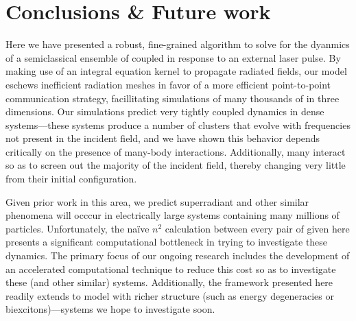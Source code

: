 \section{Conclusions \& Future work}
Here we have presented a robust, fine-grained algorithm to solve for the dyanmics of a semiclassical ensemble of coupled \qds{} in response to an external laser pulse. 
By making use of an integral equation kernel to propagate radiated fields, our model eschews inefficient radiation meshes in favor of a more efficient point-to-point communication strategy, facillitating simulations of many thousands of \qds{} in three dimensions.
Our simulations predict very tightly coupled dynamics in dense \qd{} systems---these systems produce a number of clusters that evolve with frequencies not present in the incident field, and we have shown this behavior depends critically on the presence of many-body interactions.
Additionally, many \qds{} interact so as to screen out the majority of the incident field, thereby changing very little from their initial configuration.

Given prior work in this area, we predict superradiant and other similar phenomena will occcur in electrically large systems containing many millions of particles.
Unfortunately, the na\"ive $n^2$ calculation between every pair of \qds{} given here presents a significant computational bottleneck in trying to investigate these dynamics.
The primary focus of our ongoing research includes the development of an accelerated computational technique to reduce this cost so as to investigate these (and other similar) systems.
Additionally, the framework presented here readily extends to model \qds{} with richer structure (such as energy degeneracies or biexcitons)---systems we hope to investigate soon.
